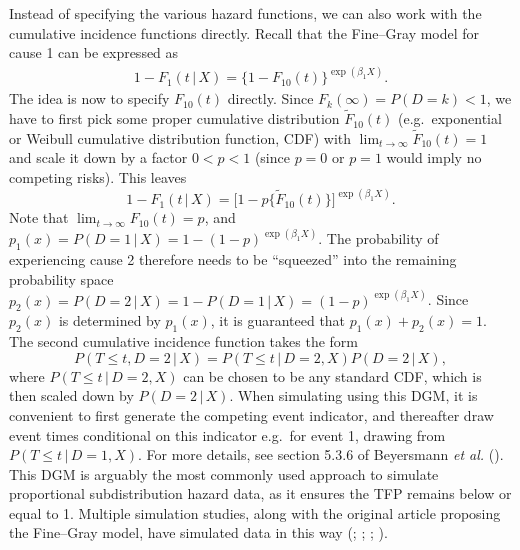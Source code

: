 \documentclass[
  letterpaper,
  DIV=11,
  numbers=noendperiod]{scrreprt}
\newcommand{\given}{\,|\,}
\begin{document}
Instead of specifying the various hazard functions, we can also work
with the cumulative incidence functions directly. Recall that the
Fine--Gray model for cause 1 can be expressed as \begin{align*}
    1 - F_1(t \given X) = \{1 - F_{10}(t)\}^{\exp(\beta_1 X)}.
\end{align*} The idea is now to specify \(F_{10}(t)\) directly. Since
\(F_k(\infty)=P(D=k)<1\), we have to first pick some proper cumulative
distribution \(\tilde{F}_{10}(t)\) (e.g.~exponential or Weibull
cumulative distribution function, CDF) with
\(\lim_{t \to \infty}\tilde{F}_{10}(t) = 1\) and scale it down by a
factor \(0< p < 1\) (since \(p = 0\) or \(p = 1\) would imply no
competing risks). This leaves \begin{equation*}
    1 - F_1(t \given X) = \big[1-p\{ \tilde{F}_{10}(t) \}\big]^{\exp(\beta_1 X)}.
\end{equation*} Note that \(\lim_{t \to \infty}F_{10}(t) = p\), and
\(p_1(x) = P(D = 1 \given X) = 1 - (1-p)^{\exp(\beta_1 X)}\). The
probability of experiencing cause 2 therefore needs to be ``squeezed''
into the remaining probability space
\(p_2(x) = P(D = 2 \given X) = 1 - P(D = 1 \given X) = (1-p)^{\exp(\beta_1 X)}\).
Since \(p_2(x)\) is determined by \(p_1(x)\), it is guaranteed that
\(p_1(x) + p_2(x) = 1\). The second cumulative incidence function takes
the form \begin{equation*}
    P(T \leq t, D=2 \given X) = P(T \leq t \given D=2, X)P(D = 2 \given X),
\end{equation*} where \(P(T \leq t \given D=2, X)\) can be chosen to be
any standard CDF, which is then scaled down by \(P(D = 2 \given X)\).
When simulating using this DGM, it is convenient to first generate the
competing event indicator, and thereafter draw event times conditional
on this indicator e.g.~for event 1, drawing from
\(P(T \leq t \given D=1, X)\). For more details, see section 5.3.6 of
Beyersmann \emph{et al.}
(). This DGM
is arguably the most commonly used approach to simulate proportional
subdistribution hazard data, as it ensures the TFP remains below or
equal to 1. Multiple simulation studies, along with the original article
proposing the Fine--Gray model, have simulated data in this way
(;
; ;
).
\end{document}
